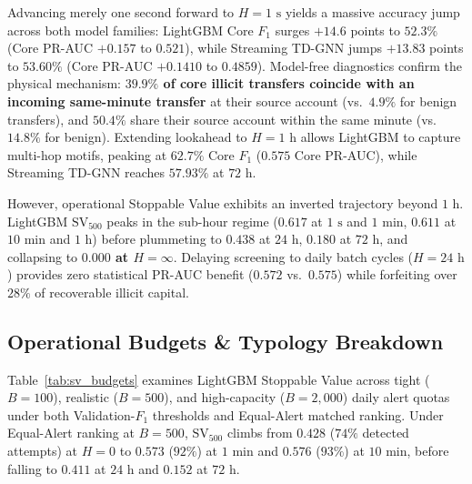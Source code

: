 \documentclass[sigconf,nonacm]{acmart}
\begin{document}
Advancing merely one second forward to $H = 1\text{ s}$ yields a massive accuracy jump across both model families: LightGBM Core $F_1$ surges $+14.6$ points to $52.3\%$ (Core PR-AUC $+0.157$ to $0.521$), while Streaming TD-GNN jumps $+13.83$ points to $53.60\%$ (Core PR-AUC $+0.1410$ to $0.4859$). Model-free diagnostics confirm the physical mechanism: \textbf{$39.9\%$ of core illicit transfers coincide with an incoming same-minute transfer} at their source account (vs.\ $4.9\%$ for benign transfers), and $50.4\%$ share their source account within the same minute (vs.\ $14.8\%$ for benign). Extending lookahead to $H = 1\text{ h}$ allows LightGBM to capture multi-hop motifs, peaking at $62.7\%$ Core $F_1$ ($0.575$ Core PR-AUC), while Streaming TD-GNN reaches $57.93\%$ at $72\text{ h}$.

However, operational Stoppable Value exhibits an inverted trajectory beyond $1\text{ h}$. LightGBM $\text{SV}_{500}$ peaks in the sub-hour regime ($0.617$ at $1\text{ s}$ and $1\text{ min}$, $0.611$ at $10\text{ min}$ and $1\text{ h}$) before plummeting to $0.438$ at $24\text{ h}$, $0.180$ at $72\text{ h}$, and collapsing to \textbf{$0.000$ at $H = \infty$}. Delaying screening to daily batch cycles ($H=24\text{ h}$) provides zero statistical PR-AUC benefit ($0.572$ vs.\ $0.575$) while forfeiting over $28\%$ of recoverable illicit capital.

\subsection{Operational Budgets \& Typology Breakdown}
Table~\ref{tab:sv_budgets} examines LightGBM Stoppable Value across tight ($B=100$), realistic ($B=500$), and high-capacity ($B=2{,}000$) daily alert quotas under both Validation-$F_1$ thresholds and Equal-Alert matched ranking. Under Equal-Alert ranking at $B=500$, $\text{SV}_{500}$ climbs from $0.428$ ($74\%$ detected attempts) at $H=0$ to $0.573$ ($92\%$) at $1\text{ min}$ and $0.576$ ($93\%$) at $10\text{ min}$, before falling to $0.411$ at $24\text{ h}$ and $0.152$ at $72\text{ h}$.
\end{document}
